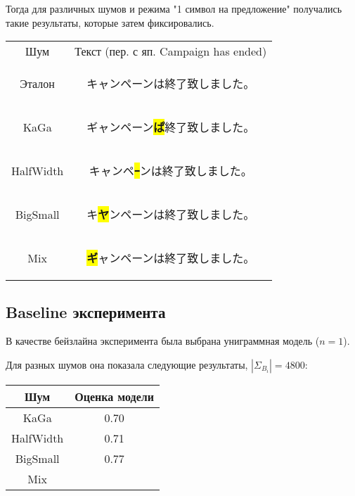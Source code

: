 Тогда для различных шумов и режима "1 символ на предложение" получались такие результаты, которые затем фиксировались.

\begin{tabular}{c|c}
	Шум 	& Текст (пер. с яп. Campaign has ended)\\
	Эталон 	& \begin{CJK}{UTF8}{min}キャンペーンは終了致しました。 \end{CJK} \\
	KaGa	&  \begin{CJK}{UTF8}{min}ギャンペーン\colorbox{yellow}{\textbf{ぱ}}終了致しました。 \end{CJK} \\
	HalfWidth &  \begin{CJK}{UTF8}{min}キャンペ\colorbox{yellow}{\textbf{ｰ}}ンは終了致しました。 \end{CJK} \\
	BigSmall &  \begin{CJK}{UTF8}{min}キ\colorbox{yellow}{\textbf{ヤ}}ンペーンは終了致しました。 \end{CJK} \\
	Mix 	&  \begin{CJK}{UTF8}{min}\colorbox{yellow}{\textbf{ギ}}ャンペーンは終了致しました。 \end{CJK} 
\end{tabular}

\subsection{ Baseline эксперимента }

В качестве бейзлайна эксперимента была выбрана униграммная модель ($n = 1$).

Для разных шумов она показала следующие результаты, $|\Sigma_{B_i}| = 4800$:

\begin{tabular}{c|c}
	Шум 	& Оценка модели \\ \hline
	KaGa	& 0.70  \\
	HalfWidth &  0.71 \\
	BigSmall & 0.77  \\
	Mix 	&  
\end{tabular}

